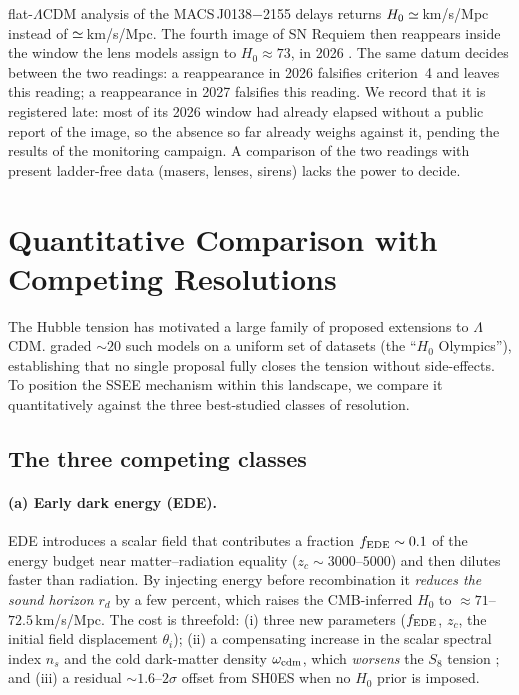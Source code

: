 \documentclass[12pt,a4paper]{article}
\begin{document}
\begin{enumerate}
        flat-$\Lambda$CDM analysis of the MACS\,J0138$-$2155 delays returns
        $H_0\simeq\val{requiem_P_H0}$\,km/s/Mpc instead of
        $\simeq\val{requiem_C_H0}$\,km/s/Mpc. The fourth image of SN Requiem
        then reappears inside the window the lens models assign to
        $H_0\approx73$, in 2026 \citep{Suyu2026,Pierel9330}. The same datum
        decides between the two readings: a reappearance in 2026 falsifies
        criterion~4 and leaves this reading; a reappearance in 2027 falsifies
        this reading. We record that it is registered late: most of its 2026
        window had already elapsed without a public report of the image, so
        the absence so far already weighs against it, pending the results of
        the monitoring campaign. A comparison of the two readings with present
        ladder-free data (masers, lenses, sirens) lacks the power to decide.
\end{enumerate}

\section{Quantitative Comparison with Competing Resolutions}
\label{sec:comparison}

The Hubble tension has motivated a large family of proposed extensions to
$\Lambda$CDM.  \citet{Schoneberg2022} graded $\sim 20$ such models on a uniform
set of datasets (the ``$H_0$ Olympics''), establishing that no single proposal
fully closes the tension without side-effects.  To position the SSEE mechanism
within this landscape, we compare it quantitatively against the three best-studied
classes of resolution.

\subsection{The three competing classes}
\label{sec:competitors}

\paragraph{(a) Early dark energy (EDE).}
EDE \citep{Karwal2016,Poulin2019,Smith2020} introduces a scalar field that
contributes a fraction $f_{\rm EDE}\sim 0.1$ of the energy budget near
matter--radiation equality ($z_c \sim 3000$--$5000$) and then dilutes faster
than radiation.  By injecting energy before recombination it \emph{reduces the
sound horizon} $r_d$ by a few percent, which raises the CMB-inferred $H_0$ to
$\approx 71$--$72.5$\,km/s/Mpc.  The cost is threefold: (i) three new parameters
($f_{\rm EDE}$, $z_c$, the initial field displacement $\theta_i$); (ii) a
compensating increase in the scalar spectral index $n_s$ and the cold
dark-matter density $\omega_{\rm cdm}$, which \emph{worsens} the $S_8$ tension
\citep{Hill2020}; and (iii) a residual $\sim 1.6$--$2\sigma$ offset from SH0ES
when no $H_0$ prior is imposed.
\end{document}
